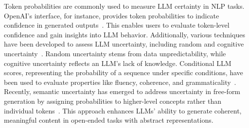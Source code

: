 Token probabilities are commonly used to measure LLM certainty in NLP tasks. OpenAI’s interface, for instance, provides token probabilities to indicate confidence in generated outputs~\cite{DBLP:journals/corr/abs-2303-08774}. This enables users to evaluate token-level confidence and gain insights into LLM behavior. Additionally, various techniques have been developed to assess LLM uncertainty, including random and cognitive uncertainty~\cite{DBLP:conf/iclr/XiongHLLFHH24}. Random uncertainty stems from data unpredictability, while cognitive uncertainty reflects an LLM’s lack of knowledge. Conditional LLM scores, representing the probability of a sequence under specific conditions, have been used to evaluate properties like fluency, coherence, and grammaticality~\cite{DBLP:conf/emnlp/BehzadZ024}. Recently, semantic uncertainty has emerged to address uncertainty in free-form generation by assigning probabilities to higher-level concepts rather than individual tokens~\cite{DBLP:journals/corr/abs-2306-01779}. This approach enhances LLMs' ability to generate coherent, meaningful content in open-ended tasks with abstract representations.



